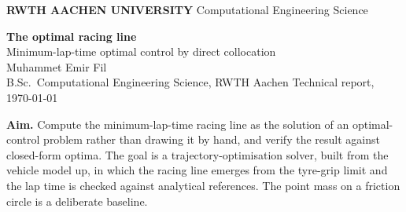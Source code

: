 \documentclass[11pt,a4paper]{article}
\newcommand{\rwthbanner}{%
  \noindent\colorbox{rwthblue}{%
    \parbox{\dimexpr\textwidth-2\fboxsep\relax}{%
      \vspace{2.5pt}%
      {\color{white}\textbf{RWTH AACHEN UNIVERSITY}}\hfill
      {\color{white}\footnotesize Computational Engineering Science}%
      \vspace{2.5pt}}}%
  \vspace{1pt}\par\noindent{\color{rule}\rule{\textwidth}{1.3pt}}%
}
\begin{document}
\rwthbanner
\vspace{0.8em}

{\raggedright
  {\LARGE\bfseries The optimal racing line}\\[0.35em]
  {\large Minimum-lap-time optimal control by direct collocation}\\[0.8em]
  {\normalsize Muhammet Emir Fil}\\[0.15em]
  {\small B.Sc.\ Computational Engineering Science, RWTH Aachen \quad\textbullet\quad Technical report, \today}\par
}
\vspace{0.6em}
\noindent{\color{rule}\rule{\textwidth}{0.6pt}}
\vspace{1.0em}

\noindent\colorbox{rwthblue25}{%
  \parbox{\dimexpr\textwidth-2\fboxsep\relax}{%
  \vspace{3pt}\textbf{Aim.} Compute the minimum-lap-time racing line as the solution of an
  optimal-control problem rather than drawing it by hand, and verify the result against
  closed-form optima. The goal is a trajectory-optimisation solver, built from the vehicle model
  up, in which the racing line emerges from the tyre-grip limit and the lap time is checked
  against analytical references. The point mass on a friction circle is a deliberate baseline.\vspace{3pt}}}

\vspace{1.0em}

\begin{abstract}
\noindent
Given a track and a tyre-grip limit, the fastest way
round is the solution of a minimum-lap-time optimal-control problem: find the controls (how to
brake, turn, and accelerate) that minimise the time to traverse a fixed arc length, subject to the
vehicle dynamics and the friction limit. This report formulates that problem, removes its free
final time by switching the independent variable to arc length, transcribes it to a nonlinear
program by direct collocation with hand-derived analytic Jacobians, and solves it. On a 2.4\,km
circuit the optimal line is 8.1\,\% faster than the geometric centreline and rides the grip limit
for nearly the whole lap, and its shape (straight-line braking, late apex, power-down on exit)
emerges without being imposed. The result is verified against closed-form optima; the core is
numpy and scipy.
\end{abstract}
\end{document}
